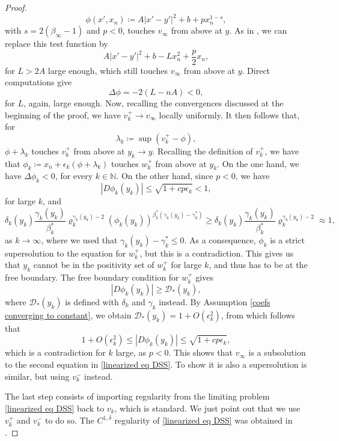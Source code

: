 \documentclass[reqno,11pt]{amsart}
\newcommand{\1}{\mathds{1}}
\numberwithin{equation}{section}
\begin{document}
\begin{proof}
$$
    \phi(x',x_n) \coloneqq A|x' - y'|^2 + b + px_n^{1-s},
$$
with $s = 2(\beta_\infty -1)$ and $p<0$, touches $v_\infty$ from above at $y$. As in \cite{DSS}, we can replace this test function by
$$
    A|x' - y'|^2 + b - Lx_n^2 + \frac{p}{2}x_n,
$$
for $L>2A$ large enough, which still touches $v_\infty$ from above at $y$. Direct computations give
$$
    \Delta \phi = -2(L - nA) < 0,
$$
for $L$, again, large enough. Now, recalling the convergences discussed at the beginning of the proof, we have $v_k^+ \to v_\infty$ locally uniformly. It then follows that, for 
$$
    \lambda_k \coloneqq \sup(v_k^+ - \phi),
$$
$\phi + \lambda_k$ touches $v_k^+$ from above at $y_k \to y$. Recalling the definition of $v_k^+$, we have that $\phi_k \coloneqq x_n + \epsilon_k(\phi + \lambda_k)$ touches $w_k^+$ from above at $y_k$. On the one hand, we have $\Delta \phi_k < 0$, for every $k \in \mathbb{N}$. On the other hand, since $p<0$, we have
$$
    |D\phi_k(y_k)| \leq \sqrt{1 + cp\epsilon_k} < 1,
$$
for large $k$, and
$$
    \delta_k(y_k)\frac{\gamma_k(y_k)}{\beta_k^\ast}\varrho_k^{\gamma_k(y_k)-2}(\phi_k(y_k))^{\beta_k^\ast(\gamma_k(y_k)-\gamma_k^\ast)} \geq \delta_k(y_k)\frac{\gamma_k(y_k)}{\beta_k^\ast}\varrho_k^{\gamma_k(y_k)-2} \approx 1,
$$
as $k \to \infty$, where we used that $\gamma_k(y_k)-\gamma_k^\ast \leq 0$. As a consequence, $\phi_k$ is a strict supersolution to the equation for $w_k^+$, but this is a contradiction. This gives us that $y_k$ cannot be in the positivity set of $w_k^+$ for large $k$, and thus has to be at the free boundary. The free boundary condition for $w_k^+$ gives
$$
    |D\phi_k(y_k)| \geq \mathcal{D}_\ast(y_k),
$$
where $\mathcal{D}_\ast(y_k)$ is defined with $\delta_k$ and $\gamma_k$ instead. By Assumption \eqref{coefs converging to constant}, we obtain $\mathcal{D}_\ast(y_k) = 1 + O(\epsilon_k^2)$, from which follows that
$$
    1 + O(\epsilon_k^2) \leq |D\phi_k(y_k)| \leq \sqrt{1 + cp\epsilon_k},
$$
which is a contradiction for $k$ large, as $p<0$. This shows that $v_\infty$ is a subsolution to the second equation in \eqref{linearized eq DSS}. To show it is also a supersolution is similar, but using $v_k^-$ instead.

The last step consists of importing regularity from the limiting problem \eqref{linearized eq DSS} back to $v_k$, which is standard. We just point out that we use $v_k^+$ and $v_k^-$ to do so. The $C^{1,\overline{\delta}}$ regularity of \eqref{linearized eq DSS} was obtained in \cite[Theorem 7.2]{DSS}.
\end{proof}
\end{document}
